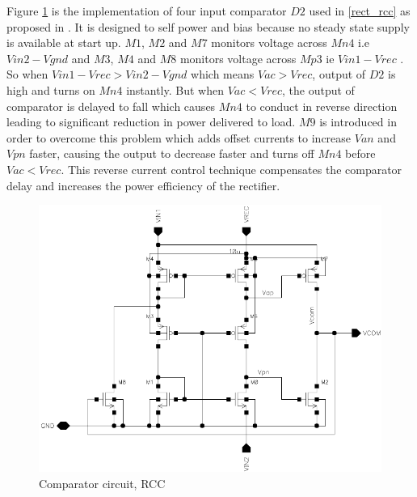\documentclass[UKenglish]{ifimaster}  %
\begin{document}
Figure \ref{rcc}  is the implementation of four input comparator $D2$ used in \ref{rect_rcc} as proposed in \cite{rectrcc}. It is designed to self power and bias because no steady state supply is available at start up. $M1$, $M2$ and $M7$ monitors voltage across $Mn4$ i.e $Vin2 - Vgnd$ and $M3$, $M4$ and $M8$ monitors voltage across $Mp3$ ie $Vin1 - Vrec$ . So when $Vin1 - Vrec > Vin2 - Vgnd$ which means $Vac > Vrec$, output of $D2$ is high and turns on $Mn4$ instantly. But when $Vac < Vrec$, the output of comparator is delayed to fall which causes $Mn4$ to conduct in reverse direction leading to significant reduction in power delivered to load. $M9$ is introduced in order to overcome this problem which adds offset currents to increase $Van$ and $Vpn$ faster, causing the output to decrease faster and turns off $Mn4$ before $Vac < Vrec$. This reverse current control technique compensates the comparator delay and increases the power efficiency of the rectifier. \\

\begin{figure}[!htbp] %
   \centering
   \includegraphics[width=\textwidth]{img/rectifier_rcc5.pdf} 
   \caption{Comparator circuit, RCC }
   \label{rcc}
\end{figure}
\end{document}
